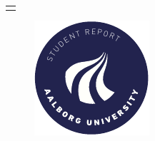 \begin{titlepage}
{{\begin{tabular}{@{}p{0.9889999\paperwidth}@{}}
            \centerline
            {
                \begin{minipage}{0.9\textwidth}
                    \bigskip
                    \centering
                    {\large \eduname, \the\year } 
                \end{minipage}
            }
			
            \if\masterproject1
                \centerline
                {
                    \begin{minipage}{0.9\textwidth}
                        \bigskip
                        \centering
                        {\Large Master's Project }
                        \smallskip
                    \end{minipage}
                }
            \fi
			
            \end{tabular}
        }
    }

  \vfill
  \begin{figure}[!b]
	\centering
    \includegraphics[width=0.2\paperwidth]{figures/formality/aau_logo_circle_en}
  \end{figure}
\end{titlepage}
\restoregeometry

